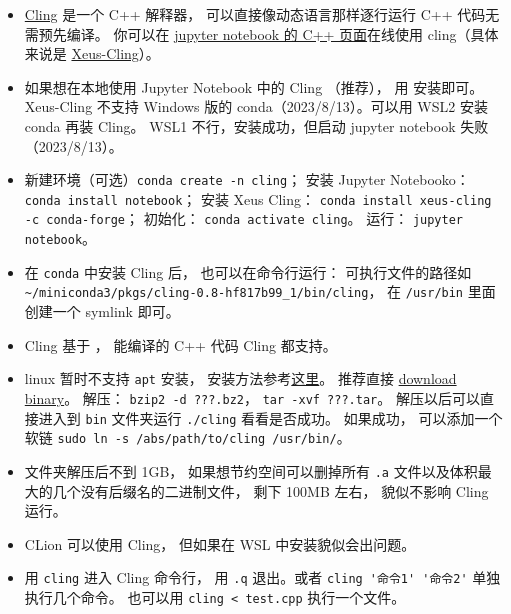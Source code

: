 
\begin{issues}
\issueDraft
\end{issues}


\begin{itemize}
\item \href{https://root.cern/cling/}{Cling} 是一个 C++ 解释器， 可以直接像动态语言那样逐行运行 C++ 代码无需预先编译。
你可以在 \href{https://jupyter.org/try}{jupyter notebook 的 C++ 页面}在线使用 cling（具体来说是 \href{https://xeus-cling.readthedocs.io/en/latest/index.html}{Xeus-Cling}）。
\item 如果想在本地使用 Jupyter Notebook 中的 Cling （推荐）， 用  安装即可。 Xeus-Cling 不支持 Windows 版的 conda（2023/8/13）。可以用 WSL2 安装 conda 再装 Cling。 WSL1 不行，安装成功，但启动 jupyter notebook 失败（2023/8/13）。
\item 新建环境（可选）\verb|conda create -n cling|； 安装 Jupyter Notebooko：\verb|conda install notebook|； 安装 Xeus Cling： \verb|conda install xeus-cling -c conda-forge|； 初始化： \verb|conda activate cling|。 运行： \verb|jupyter notebook|。
\item 在 \verb|conda| 中安装 Cling 后， 也可以在命令行运行： 可执行文件的路径如 \verb|~/miniconda3/pkgs/cling-0.8-hf817b99_1/bin/cling|， 在 \verb|/usr/bin| 里面创建一个 symlink 即可。
\item Cling 基于 ，  能编译的 C++ 代码 Cling 都支持。
\item linux 暂时不支持 \verb|apt| 安装， 安装方法参考\href{https://kaustubh13.medium.com/how-to-install-cling-on-linux-or-wsl-8125798ed9b9}{这里}。 推荐直接 \href{https://root.cern/download/cling/}{download binary}。 解压： \verb|bzip2 -d ???.bz2|， \verb|tar -xvf ???.tar|。 解压以后可以直接进入到 \verb|bin| 文件夹运行 \verb|./cling| 看看是否成功。 如果成功， 可以添加一个软链 \verb|sudo ln -s /abs/path/to/cling /usr/bin/|。
\item 文件夹解压后不到 1GB， 如果想节约空间可以删掉所有 \verb|.a| 文件以及体积最大的几个没有后缀名的二进制文件， 剩下 100MB 左右， 貌似不影响 Cling 运行。
\item CLion 可以使用 Cling， 但如果在 WSL 中安装貌似会出问题。
\item 用 \verb|cling| 进入 Cling 命令行， 用 \verb|.q| 退出。或者 \verb|cling '命令1' '命令2'| 单独执行几个命令。 也可以用 \verb|cling < test.cpp| 执行一个文件。

\end{itemize}
